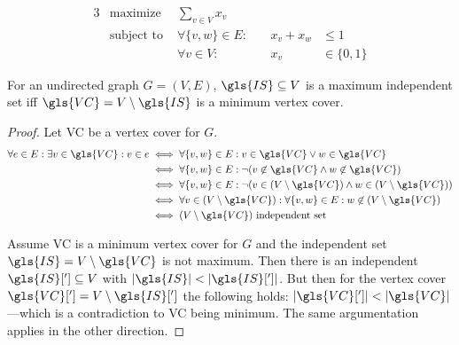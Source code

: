 
\begin{problem}
  \begin{alignat*}{3}
    &\text{maximize } & \sum\limits_{v \in V} x_v \\
    &\text{subject to } & \forall \{v,w\} \in E : &~& x_v + x_w &\leq 1 \\
    && \forall v \in V : &~& x_v &\in \{0,1\}
  \end{alignat*}
\end{problem}


\begin{theorem}
  \label{thm:independent_set_vertex_cover}
  For an undirected graph \(G=(V,E)\), \(\gls{IS} \subseteq V\)
  is a maximum independent set iff
  \(\gls{VC} = V \setminus \gls{IS}\) is a minimum vertex
  cover.
\end{theorem}

\begin{proof}
  Let \gls{VC} be a vertex cover for \(G\). 
  \begin{alignat*}{1}
    \forall e \in E : \exists v \in \gls{VC} : v \in e
    &\iff \forall \{v,w\} \in E :
      v \in \gls{VC} \lor w \in \gls{VC} \\
    &\iff \forall \{v, w\} \in E :
      \lnot(v \not\in \gls{VC} \land w \not\in \gls{VC}) \\
    &\iff \forall \{v, w\} \in E :
      \lnot(v \in (V \setminus \gls{VC})
        \land w \in (V \setminus \gls{VC})) \\
    &\iff \forall v \in (V \setminus \gls{VC}) :
      \forall \{v, w\} \in E :
      w \not\in (V \setminus \gls{VC}) \\
    &\iff (V \setminus \gls{VC}) \text{ independent set}
  \end{alignat*}
  
  Assume \gls{VC} is a minimum vertex cover for \(G\) and the
  independent set \(\gls{IS} = V \setminus \gls{VC}\) is not maximum.
  Then there is an independent \(\gls{IS}['] \subseteq V\) with
  \(|\gls{IS}| < |\gls{IS}[']|\). But then for the vertex cover
  \(\gls{VC}['] = V \setminus \gls{IS}[']\) the following holds:
  \(|\gls{VC}[']| < |\gls{VC}|\)---which is a contradiction to
  \gls{VC} being minimum. The same argumentation applies in the other
  direction.
\end{proof}

